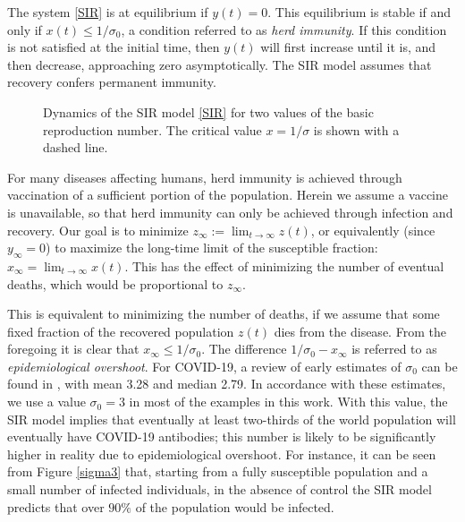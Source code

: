 \documentclass[english,12pt,letter]{article}
\newcommand{\Rnot}{\sigma_0}
\newcommand{\Sinf}{x_\infty}
\begin{document}
The system \eqref{SIR} is at equilibrium if $y(t)=0$.  This equilibrium is stable if and
only if $x(t)\le 1/\Rnot$, a condition referred to as {\em herd immunity}.  If
this condition is not satisfied at
the initial time, then $y(t)$ will first increase until it is, and then decrease,
approaching zero asymptotically.  The SIR model assumes that recovery
confers permanent immunity.

\begin{figure}
    \centering
    \caption{Dynamics of the SIR model \eqref{SIR} for two values of the basic reproduction number.
            The critical value $x=1/\sigma$ is shown with a dashed line.\label{fig:dynamics}}
\end{figure}

For many diseases affecting humans, herd immunity is achieved
through vaccination of a sufficient portion of the population.  Herein
we assume a vaccine is unavailable, so that herd immunity can only be achieved
through infection and recovery.
Our goal is to minimize $z_\infty := \lim_{t \to \infty} z(t)$, or equivalently
(since $y_\infty=0$)
to maximize the long-time limit of the susceptible fraction:
$\Sinf = \lim_{t\to\infty} x(t)$.
This has the effect of minimizing
the number of eventual deaths, which would be proportional to $z_\infty$.

This is equivalent to minimizing the number of deaths, if we assume that
some fixed fraction of the recovered population $z(t)$ dies from the disease.
From the foregoing it is clear that $\Sinf \le 1/\Rnot$.  The difference
$1/\Rnot-\Sinf$ is referred to as {\em epidemiological overshoot}.
For COVID-19, a review of early estimates of $\Rnot$ can be found in
\cite[Table 1]{liu2020reproductive}, with mean 3.28 and median 2.79.
In accordance with these estimates, we use a value $\Rnot=3$ in most of
the examples in this work.  With this value, the SIR model implies that eventually
at least two-thirds of the world population will eventually have COVID-19 antibodies;
this number is likely to be significantly higher in reality due to epidemiological
overshoot.  For instance, it can be seen from Figure \ref{sigma3} that, starting
from a fully susceptible population and a small number of infected individuals,
in the absence of control the SIR model predicts that over $90\%$ of the population
would be infected.
\end{document}

